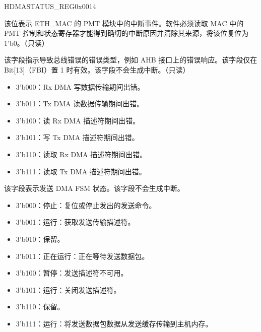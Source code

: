 \begin{register}{H}{DMASTATUS\_REG}{0x0014}\label{regdesc:DMASTATUSREG}

%
%
%
%
%
%
%
%
%
%
%
%
%
%
%
%
%
%
%
%
%
%
%
\regnewline%
\begin{regdesc}\begin{reglist}

\item [EMAC\_PMT\_INT]该位表示 ETH\_MAC 的 PMT 模块中的中断事件。软件必须读取 MAC 中的 PMT 控制和状态寄存器才能得到确切的中断原因并清除其来源，将该位复位为 1'b0。（只读）

\item [ERROR\_BITS] 该字段指示导致总线错误的错误类型，例如 AHB 接口上的错误响应。该字段仅在 Bit[13]（FBI）置 1 时有效。该字段不会生成中断。（只读）\begin{itemize}
    \item 3'b000：Rx DMA 写数据传输期间出错。   \item3'b011：Tx DMA 读数据传输期间出错。  \item3'b100：读 Rx DMA 描述符期间出错。  \item3'b101：写 Tx DMA 描述符期间出错。  \item3'b110：读取 Rx DMA 描述符期间出错。  \item3'b111：读取 Tx DMA 描述符期间出错。
    \end{itemize}
\item [TRANS\_PROC\_STATE]该字段表示发送 DMA FSM 状态。该字段不会生成中断。
\begin{itemize}
    \item 3'b000：停止：复位或停止发出的发送命令。 \item 3'b001：运行：获取发送传输描述符。
    \item 3'b010：保留。 \item 3'b011：正在运行：正在等待发送数据包。 \item 3'b100：暂停：发送描述符不可用。\item 3'b101：运行：关闭发送描述符。\item 3'b110：保留。 \item 3'b111：运行：将发送数据包数据从发送缓存传输到主机内存。\end{itemize}

    \item [寄存器描述下一页继续。]
\end{reglist}\end{regdesc}
\end{register}

